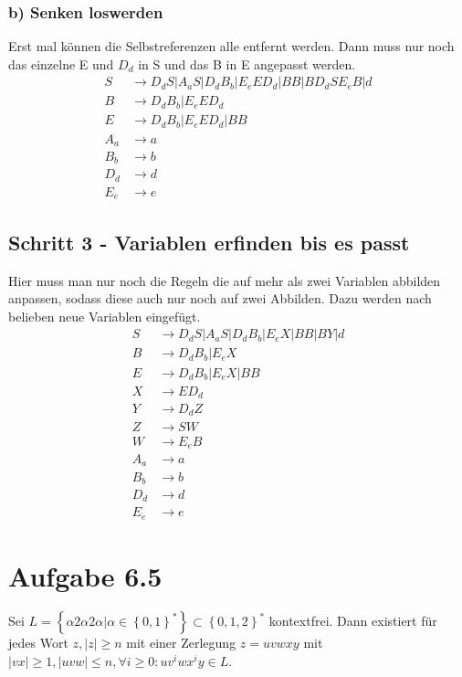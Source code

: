 \documentclass{article}
\begin{document}
\subsubsection*{b) Senken loswerden}
Erst mal können die Selbstreferenzen alle entfernt werden. Dann muss nur noch das einzelne E und $D_d$ in S und das B in E angepasst werden.
\begin{align*}
S&\rightarrow D_dS | A_aS | D_dB_b | E_eED_d | BB | BD_dSE_eB | d\\
B&\rightarrow D_dB_b | E_eED_d\\
E&\rightarrow D_dB_b | E_eED_d | BB\\
A_a&\rightarrow a\\
B_b&\rightarrow b\\
D_d&\rightarrow d\\
E_e&\rightarrow e
\end{align*}

\subsection*{Schritt 3 - Variablen erfinden bis es passt}
Hier muss man nur noch die Regeln die auf mehr als zwei Variablen abbilden anpassen, sodass diese auch nur noch auf zwei Abbilden. Dazu werden nach belieben neue Variablen eingefügt.
\begin{align*}
S&\rightarrow D_dS | A_aS | D_dB_b | E_eX | BB | BY | d\\
B&\rightarrow D_dB_b | E_eX\\
E&\rightarrow D_dB_b | E_eX | BB\\
X&\rightarrow ED_d \\
Y&\rightarrow D_dZ \\
Z&\rightarrow SW \\
W&\rightarrow E_eB \\
A_a&\rightarrow a\\
B_b&\rightarrow b\\
D_d&\rightarrow d\\
E_e&\rightarrow e
\end{align*}



\section*{Aufgabe 6.5}
Sei $L = \left\{\alpha 2 \alpha 2 \alpha | \alpha \in \left\{0,1\right\}^* \right\} \subset \left\{0,1,2\right\}^*$ kontextfrei. Dann existiert für jedes Wort $z, |z|\geq n$ mit einer Zerlegung $z=uvwxy$ mit $|vx|\geq 1, |uvw|\leq n, \forall i \geq 0: uv^iwx^iy \in L$.
\end{document}
